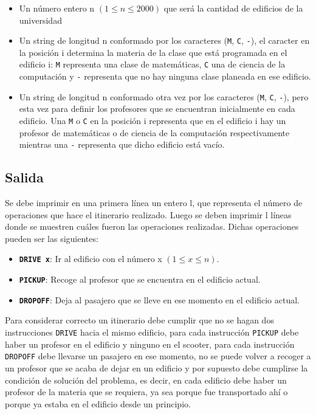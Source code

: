 \documentclass[11pt]{article}
\begin{document}
    \begin{itemize}
        \item Un número entero  n $(1 \leq n \leq 2000)$ que será la cantidad de edificios de la universidad
        \item Un string de longitud n conformado por los caracteres (\texttt{M}, \texttt{C}, \texttt{-}), el caracter
              en la posición i determina la materia de la clase que está programada en el edificio i: \texttt{M} representa
              una clase de matemáticas, \texttt{C} una de ciencia de la computación y \texttt{-} representa que no hay ninguna
              clase planeada en ese edificio.
        \item Un string de longitud n conformado otra vez por los caracteres (\texttt{M}, \texttt{C}, \texttt{-}),
              pero esta vez para definir los profesores que se encuentran inicialmente en cada edificio. Una \texttt{M}
              o \texttt{C} en la posición i representa que en el edificio i hay un profesor de matemáticas o de ciencia de la 
              computación respectivamente mientras una \texttt{-} representa que dicho edificio está vacío.
    \end{itemize}

    \subsection{Salida}
    Se debe imprimir en una primera línea un entero l, que representa el número de operaciones que hace el
    itinerario realizado.
    Luego se deben imprimir l líneas donde se muestren cuáles fueron las operaciones realizadas. Dichas operaciones
    pueden ser las siguientes:

    \begin{itemize}
        \item \textbf{\texttt{DRIVE x}}: Ir al edificio con el número x $(1 \leq x \leq n)$.
        \item \textbf{\texttt{PICKUP}}: Recoge al profesor que se encuentra en el edificio actual.
        \item \textbf{\texttt{DROPOFF}}: Deja al pasajero que se lleve en ese momento en el edificio actual.
    \end{itemize}

    Para considerar correcto un itinerario debe cumplir que no se hagan dos instrucciones \texttt{DRIVE}
    hacia el mismo edificio, para cada instrucción \texttt{PICKUP} debe haber un profesor en el edificio y
    ninguno en el scooter, para cada instrucción \texttt{DROPOFF} debe llevarse un pasajero en ese momento,
    no se puede volver a recoger a un profesor que se acaba de dejar en un edificio y por supuesto debe cumplirse
    la condición de solución del problema, es decir, en cada edificio debe haber un profesor de la materia que
    se requiera, ya sea porque fue transportado ahí o porque ya estaba en el edificio desde un principio.
\end{document}
